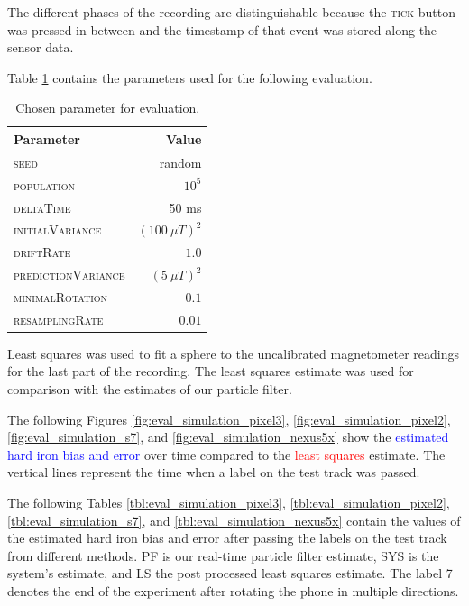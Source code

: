 The different phases of the recording are distinguishable because the \textsc{tick} button was pressed in between and the timestamp of that event was stored along the sensor data.

Table \ref{tbl:eval_params} contains the parameters used for the following evaluation.

\begin{table}[H]
    \centering
    \begin{tabular}{ | l | r | }
    \hline
    \textbf{Parameter}              & \textbf{Value} \\ \hline
    \textsc{seed}                   & random \\ \hline
    \textsc{population}             & $10^5$ \\ \hline
    \textsc{deltaTime}              & 50 ms \\ \hline
    \textsc{initialVariance}        & $(100\ \mu T)^2$ \\ \hline
    \textsc{driftRate}              & $1.0$ \\ \hline
    \textsc{predictionVariance}     & $(5\ \mu T)^2$ \\ \hline
    \textsc{minimalRotation}        & $0.1$ \\ \hline
    \textsc{resamplingRate}         & $0.01$ \\ \hline
    \end{tabular}
    \caption{Chosen parameter for evaluation.}
    \label{tbl:eval_params}
\end{table}

Least squares was used to fit a sphere\cite{Jekel2016} to the uncalibrated magnetometer readings for the last part of the recording. The least squares estimate was used for comparison with the estimates of our particle filter.

The following Figures \ref{fig:eval_simulation_pixel3}, \ref{fig:eval_simulation_pixel2}, \ref{fig:eval_simulation_s7}, and \ref{fig:eval_simulation_nexus5x} show the \textcolor{blue}{estimated hard iron bias and error} over time compared to the \textcolor{red}{least squares} estimate. The vertical lines represent the time when a label on the test track was passed.

The following Tables \ref{tbl:eval_simulation_pixel3}, \ref{tbl:eval_simulation_pixel2}, \ref{tbl:eval_simulation_s7}, and \ref{tbl:eval_simulation_nexus5x} contain the values of the estimated hard iron bias and error after passing the labels on the test track from different methods. \textsc{PF} is our real-time particle filter estimate, \textsc{SYS} is the system's estimate, and \textsc{LS} the post processed least squares estimate. The label 7 denotes the end of the experiment after rotating the phone in multiple directions.

